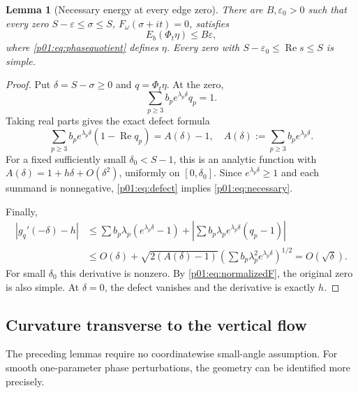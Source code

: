 \documentclass[11pt,letterpaper]{article}
\newtheorem{lemma}[theorem]{Lemma}
\theoremstyle{definition}
\theoremstyle{remark}
\newcommand{\eps}{\varepsilon}
\newcommand{\Ree}{\operatorname{Re}}
\newcommand{\1}{\mathbf 1}
\begin{document}
\begin{lemma}[Necessary energy at every edge zero]\label{p01:lem:necessary}
There are $B,\eps_0>0$ such that every zero
$S-\eps\le\sigma\le S$, $F_\omega(\sigma+it)=0$, satisfies
\begin{equation}\label{p01:eq:necessary}
 E_b(\Phi_t\eta)\le B\eps,
\end{equation}
where \eqref{p01:eq:phasequotient} defines $\eta$.
Every zero with $S-\eps_0\le\Ree s\le S$ is simple.
\end{lemma}
\begin{proof}
Put $\delta=S-\sigma\ge0$ and $q=\Phi_t\eta$. At the zero,
\begin{equation}\label{p01:eq:zeroequation}
 \sum_{p\ge3}b_pe^{\lambda_p\delta}q_p=1.
\end{equation}
Taking real parts gives the exact defect formula
\begin{equation}\label{p01:eq:defect}
 \sum_{p\ge3}b_pe^{\lambda_p\delta}(1-\Ree q_p)
 =A(\delta)-1,
 \quad A(\delta):=\sum_{p\ge3}b_pe^{\lambda_p\delta}.
\end{equation}
For a fixed sufficiently small $\delta_0<S-1$, this is an analytic
function with
$A(\delta)=1+h\delta+O(\delta^2)$, uniformly on $[0,\delta_0]$.
Since $e^{\lambda_p\delta}\ge1$ and each summand is nonnegative,
\eqref{p01:eq:defect} implies \eqref{p01:eq:necessary}.

Finally,
\begin{align*}
 |g_q'(-\delta)-h|
 &\le\sum b_p\lambda_p(e^{\lambda_p\delta}-1)
  +\left|\sum b_p\lambda_pe^{\lambda_p\delta}(q_p-1)\right|\\
 &\le O(\delta)
  +\sqrt{2(A(\delta)-1)}
       \left(\sum b_p\lambda_p^2e^{\lambda_p\delta}\right)^{1/2}
 =O(\sqrt\delta).
\end{align*}
For small $\delta_0$ this derivative is nonzero. By
\eqref{p01:eq:normalizedF}, the original zero is also simple. At
$\delta=0$, the defect vanishes and the derivative is exactly $h$.
\end{proof}

\subsection{Curvature transverse to the vertical flow}

The preceding lemmas require no coordinatewise small-angle assumption.
For smooth one-parameter phase perturbations, the geometry can be
identified more precisely.
\end{document}
